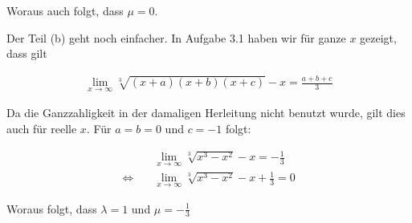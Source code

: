 \documentclass[a4paper,german,12pt,smallheadings]{scrartcl}
\begin{document}
Woraus auch folgt, dass $\mu = 0$.

Der Teil (b) geht noch einfacher. In Aufgabe 3.1 haben wir für ganze $x$
gezeigt, dass gilt

\begin{align*}
  \lim_{x \to \infty} \sqrt[3]{(x+a)(x+b)(x+c)} - x = \frac{a+b+c}{3}
\end{align*}

Da die Ganzzahligkeit in der damaligen Herleitung nicht benutzt wurde, gilt
dies auch für reelle $x$. Für $a = b = 0$ und $c = -1$ folgt:

\begin{align*}
  &\lim_{x \to \infty} \sqrt[3]{x^3 - x^2} - x = -\frac{1}{3} \\
  \Leftrightarrow\quad &\lim_{x \to \infty} \sqrt[3]{x^3 - x^2} - x + \frac{1}{3} = 0
\end{align*}

Woraus folgt, dass $\lambda = 1$ und $\mu = -\frac{1}{3}$
\end{document}
